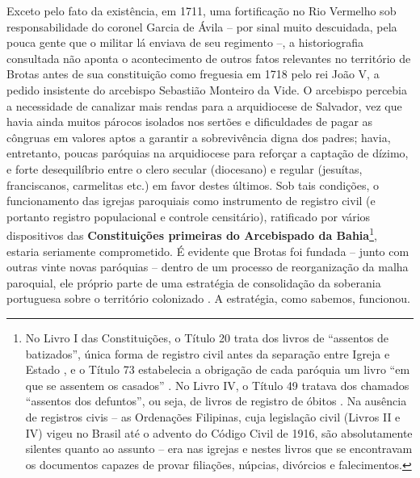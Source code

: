 Exceto pelo fato da existência, em 1711, uma fortificação no Rio Vermelho sob responsabilidade do coronel Garcia de Ávila -- por sinal muito descuidada, pela pouca gente que o militar lá enviava de seu regimento \cite[p. 99]{cabral_manuscritos_1883} --, a historiografia consultada não aponta o acontecimento de outros fatos relevantes no território de Brotas antes de sua constituição como freguesia em 1718 pelo rei João V, a pedido insistente do arcebispo Sebastião Monteiro da Vide. O arcebispo percebia a necessidade de canalizar mais rendas para a arquidiocese de Salvador, vez que havia ainda muitos párocos isolados nos sertões e dificuldades de pagar as côngruas em valores aptos a garantir a sobrevivência digna dos padres; havia, entretanto, poucas paróquias na arquidiocese para reforçar a captação de dízimo, e forte desequilíbrio entre o clero secular (diocesano) e regular (jesuítas, franciscanos, carmelitas etc.) em favor destes últimos. Sob tais condições, o funcionamento das igrejas paroquiais como instrumento de registro civil (e portanto registro populacional e controle censitário), ratificado por vários dispositivos das \textbf{Constituições primeiras do Arcebispado da Bahia}\footnote{No Livro I das Constituições, o Título 20 trata dos livros de ``assentos de batizados'', única forma de registro civil antes da separação entre Igreja e Estado \cite[pp.~28-31]{vide_const_2007}, e o Título 73 estabelecia a obrigação de cada paróquia um livro ``em que se assentem os casados'' \cite[pp.~130-131]{vide_const_2007}. No Livro IV, o Título 49 tratava dos chamados ``assentos dos defuntos'', ou seja, de livros de registro de óbitos \cite[pp.~292-293]{vide_const_2007}. Na ausência de registros civis -- as Ordenações Filipinas, cuja legislação civil (Livros II e IV) vigeu no Brasil até o advento do Código Civil de 1916, são absolutamente silentes quanto ao assunto -- era nas igrejas e nestes livros que se encontravam os documentos capazes de provar filiações, núpcias, divórcios e falecimentos.}, estaria seriamente comprometido. É evidente que Brotas foi fundada -- junto com outras vinte novas paróquias -- dentro de um processo de reorganização da malha paroquial, ele próprio parte de uma estratégia de consolidação da soberania portuguesa sobre o território colonizado \cite[pp.~26-30]{vivas_botelho_2011}. A estratégia, como sabemos, funcionou.

